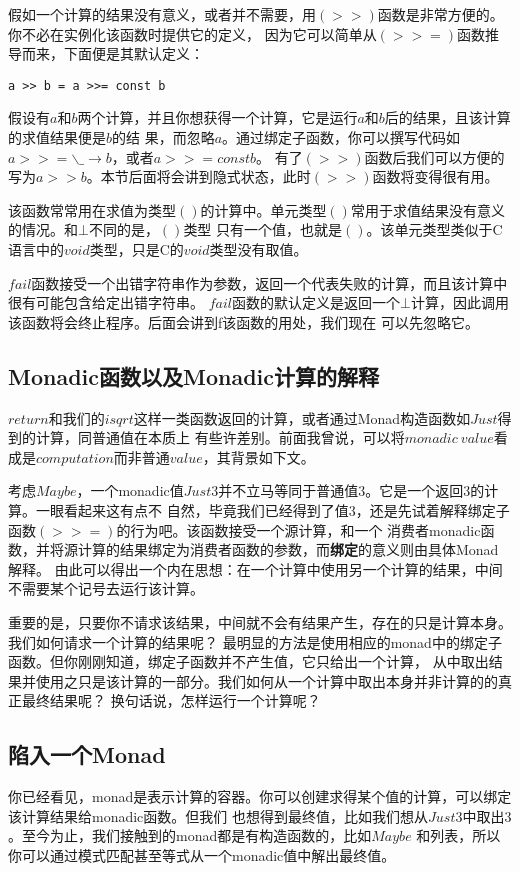 假如一个计算的结果没有意义，或者并不需要，用$(>>)$函数是非常方便的。你不必在实例化该函数时提供它的定义，
因为它可以简单从$(>>=)$函数推导而来，下面便是其默认定义：

\begin{lstlisting}
a >> b = a >>= const b
\end{lstlisting}

假设有$a$和$b$两个计算，并且你想获得一个计算，它是运行$a$和$b$后的结果，且该计算的求值结果便是$b$的结
果，而忽略$a$。通过绑定子函数，你可以撰写代码如$a >>= \backslash\_ \rightarrow b$，或者$ a >>= const b$。
有了$(>>)$函数后我们可以方便的写为$a >> b$。本节后面将会讲到隐式状态，此时$(>>)$函数将变得很有用。

该函数常常用在求值为类型$()$的计算中。单元类型$()$常用于求值结果没有意义的情况。和$\bot$不同的是，$()$类型
只有一个值，也就是$()$。该单元类型类似于C语言中的$void$类型，只是C的$void$类型没有取值。

$fail$函数接受一个出错字符串作为参数，返回一个代表失败的计算，而且该计算中很有可能包含给定出错字符串。
$fail$函数的默认定义是返回一个$\bot$计算，因此调用该函数将会终止程序。后面会讲到f该函数的用处，我们现在
可以先忽略它。

\subsection{Monadic函数以及Monadic计算的解释}
$return$和我们的$isqrt$这样一类函数返回的计算，或者通过Monad构造函数如$Just$得到的计算，同普通值在本质上
有些许差别。前面我曾说，可以将$monadic\ value$看成是$computation$而非普通$value$，其背景如下文。

考虑$Maybe$，一个monadic值$Just 3$并不立马等同于普通值$3$。它是一个返回$3$的计算。一眼看起来这有点不
自然，毕竟我们已经得到了值$3$，还是先试着解释绑定子函数$(>>=)$的行为吧。该函数接受一个源计算，和一个
消费者monadic函数，并将源计算的结果绑定为消费者函数的参数，而\textbf{绑定}的意义则由具体Monad解释。
由此可以得出一个内在思想：在一个计算中使用另一个计算的结果，中间不需要某个记号去运行该计算。

重要的是，只要你不请求该结果，中间就不会有结果产生，存在的只是计算本身。我们如何请求一个计算的结果呢？
最明显的方法是使用相应的monad中的绑定子函数。但你刚刚知道，绑定子函数并不产生值，它只给出一个计算，
从中取出结果并使用之只是该计算的一部分。我们如何从一个计算中取出本身并非计算的的真正最终结果呢？
换句话说，怎样运行一个计算呢？

\subsection{陷入一个Monad}
你已经看见，monad是表示计算的容器。你可以创建求得某个值的计算，可以绑定该计算结果给monadic函数。但我们
也想得到最终值，比如我们想从$Just 3$中取出$3$。至今为止，我们接触到的monad都是有构造函数的，比如$Maybe$
和列表，所以你可以通过模式匹配甚至等式从一个monadic值中解出最终值。

